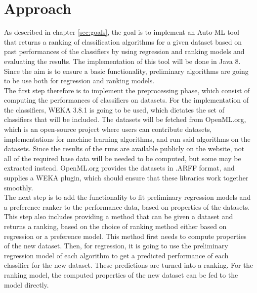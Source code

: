 \documentclass[12pt]{scrartcl}
\begin{document}
\section{Approach}\label{sec:approach}
As described in chapter \ref{sec:goals}, the goal is to implement an Auto-ML tool that returns a ranking of classification algorithms for a given dataset based on past performances of the classifiers by using regression and ranking models and evaluating the results. The implementation of this tool will be done in Java 8. Since the aim is to ensure a basic functionality, preliminary algorithms are going to be use both for regression and ranking models.\\ 

The first step therefore is to implement the preprocessing phase, which consist of computing the performances of classifiers on datasets. For the implementation of the classifiers, WEKA 3.8.1 is going to be used, which dictates the set of classifiers that will be included\footnotemark. The datasets will be fetched from OpenML.org, which is an open-source project where users can contribute datasets, implementations for machine learning algorithms, and run said algorithms on the datasets. Since the results of the runs are available publicly on the website, not all of the required base data will be needed to be computed, but some may be extracted instead. OpenML.org provides the datasets in .ARFF format, and supplies a WEKA plugin, which should ensure that these libraries work together smoothly. \\

The next step is to add the functionality to fit preliminary regression models and a preference ranker to the performance data, based on properties of the datasets. This step also includes providing a method that can be given a dataset and returns a ranking, based on the choice of ranking method either based on regression or a preference model. This method first needs to compute properties of the new dataset. Then, for regression, it is going to use the preliminary regression model of each algorithm to get a predicted performance of each classifier for the new dataset. These predictions are turned into a ranking. For the ranking model, the computed properties of the new dataset can be fed to the model directly.\\

\end{document}

